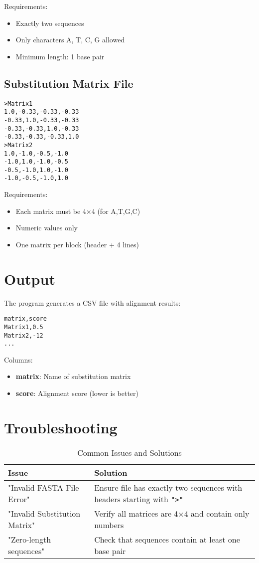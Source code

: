 \documentclass{article}
\begin{document}
Requirements:
\begin{itemize}
\item Exactly two sequences
\item Only characters A, T, C, G allowed
\item Minimum length: 1 base pair
\end{itemize}

\subsection{Substitution Matrix File}
\begin{lstlisting}
>Matrix1
1.0,-0.33,-0.33,-0.33
-0.33,1.0,-0.33,-0.33
-0.33,-0.33,1.0,-0.33
-0.33,-0.33,-0.33,1.0
>Matrix2
1.0,-1.0,-0.5,-1.0
-1.0,1.0,-1.0,-0.5
-0.5,-1.0,1.0,-1.0
-1.0,-0.5,-1.0,1.0
\end{lstlisting}

Requirements:
\begin{itemize}
\item Each matrix must be 4×4 (for A,T,G,C)
\item Numeric values only
\item One matrix per block (header + 4 lines)
\end{itemize}

\section{Output}
The program generates a CSV file with alignment results:
\begin{lstlisting}
matrix,score
Matrix1,0.5
Matrix2,-12
...
\end{lstlisting}

Columns:
\begin{itemize}
\item \textbf{matrix}: Name of substitution matrix
\item \textbf{score}: Alignment score (lower is better)
\end{itemize}

\section{Troubleshooting}
\begin{table}[h]
\centering
\caption{Common Issues and Solutions}
\begin{tabularx}{\textwidth}{lX}
\toprule
\textbf{Issue} & \textbf{Solution} \\
\midrule
"Invalid FASTA File Error" & Ensure file has exactly two sequences with headers starting with \texttt{">"} \\
"Invalid Substitution Matrix" & Verify all matrices are 4×4 and contain only numbers \\
"Zero-length sequences" & Check that sequences contain at least one base pair \\
\bottomrule
\end{tabularx}
\end{table}
\end{document}
